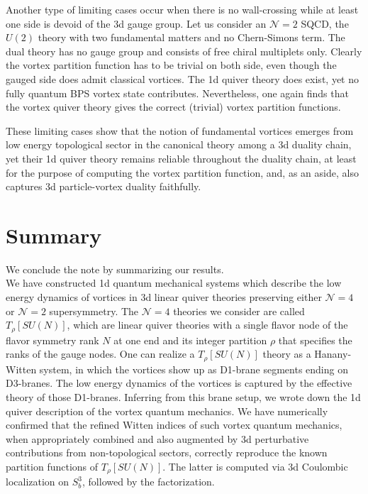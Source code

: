 \documentclass[a4paper,11pt]{article}
\begin{document}
Another type of limiting cases occur when there is no wall-crossing while at least one side is devoid of the 3d gauge group. Let us consider an $\mathcal N = 2$ SQCD, the $U(2)$ theory with two fundamental matters and no Chern-Simons term. The dual theory has no gauge group and consists of free chiral multiplets only. Clearly the vortex partition function has to be trivial on both side, even though the gauged side does admit classical vortices. The 1d quiver theory does exist, yet no fully quantum BPS vortex state contributes. Nevertheless, one again finds that the vortex quiver theory  gives the correct (trivial) vortex partition functions.

These limiting cases show that  the notion of fundamental vortices emerges from low energy topological sector in the canonical theory among a 3d duality chain, yet their 1d quiver theory remains reliable throughout the duality chain, at least for the purpose of computing the vortex partition function, and, as an aside, also captures 3d particle-vortex duality faithfully.
\\





\section{Summary}
\label{sec:summary}

We conclude the note by summarizing our results.
\\


We have constructed 1d quantum mechanical systems which describe the low energy dynamics of vortices in 3d linear quiver theories preserving either $\mathcal N = 4$ or $\mathcal N = 2$ supersymmetry. The $\mathcal N = 4$ theories we consider are called $T_\rho [SU(N)]$, which are linear quiver theories with a single flavor node of the flavor symmetry rank $N$ at one end and its integer partition $\rho$ that specifies the ranks of the gauge nodes. One can realize a $T_\rho [SU(N)]$ theory as a Hanany-Witten system, in which the vortices show up as D1-brane segments ending on D3-branes. The low energy dynamics of the vortices is captured by the effective theory of those D1-branes. Inferring from this brane setup, we wrote down the 1d quiver description of the vortex quantum mechanics. We have numerically confirmed that the refined Witten indices of such vortex quantum mechanics, when appropriately combined and also augmented by 3d perturbative contributions from non-topological sectors, correctly reproduce the known partition functions of $T_\rho [SU(N)]$. The latter is computed via 3d Coulombic localization on $S^3_b$, followed by the factorization.
\end{document}

